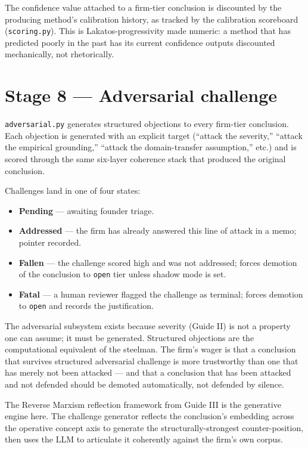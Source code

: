 \documentclass[11pt,letterpaper]{article}
\newcommand{\file}[1]{\texttt{#1}}
\begin{document}
The confidence value attached to a firm-tier conclusion is discounted by the producing method's calibration history, as tracked by the calibration scoreboard (\file{scoring.py}). This is Lakatos-progressivity made numeric: a method that has predicted poorly in the past has its current confidence outputs discounted mechanically, not rhetorically.

\section{Stage 8 --- Adversarial challenge}

\file{adversarial.py} generates structured objections to every firm-tier conclusion. Each objection is generated with an explicit target (``attack the severity,'' ``attack the empirical grounding,'' ``attack the domain-transfer assumption,'' etc.) and is scored through the same six-layer coherence stack that produced the original conclusion.

Challenges land in one of four states:

\begin{itemize}[leftmargin=1.5em,itemsep=0.1em]
\item \textbf{Pending} --- awaiting founder triage.
\item \textbf{Addressed} --- the firm has already answered this line of attack in a memo; pointer recorded.
\item \textbf{Fallen} --- the challenge scored high and was not addressed; forces demotion of the conclusion to \texttt{open} tier unless shadow mode is set.
\item \textbf{Fatal} --- a human reviewer flagged the challenge as terminal; forces demotion to \texttt{open} and records the justification.
\end{itemize}

The adversarial subsystem exists because severity (Guide II) is not a property one can assume; it must be generated. Structured objections are the computational equivalent of the steelman. The firm's wager is that a conclusion that survives structured adversarial challenge is more trustworthy than one that has merely not been attacked --- and that a conclusion that has been attacked and not defended should be demoted automatically, not defended by silence.

The Reverse Marxism reflection framework from Guide III is the generative engine here. The challenge generator reflects the conclusion's embedding across the operative concept axis to generate the structurally-strongest counter-position, then uses the LLM to articulate it coherently against the firm's own corpus.
\end{document}
